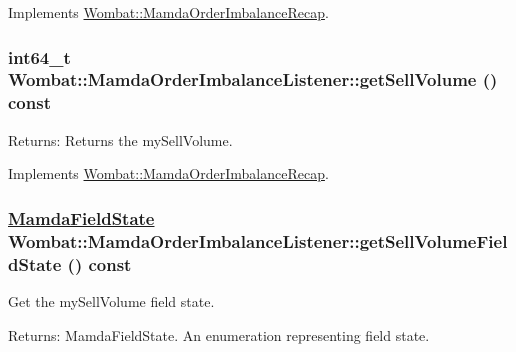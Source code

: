 Implements \hyperlink{classWombat_1_1MamdaOrderImbalanceRecap_869bc84756e63963c4b47e0c63ae92c4}{Wombat::Mamda\-Order\-Imbalance\-Recap}.\hypertarget{classWombat_1_1MamdaOrderImbalanceListener_fce0392a0c33cf57e534908cb29cd10e}{
\subsubsection[getSellVolume]{\setlength{\rightskip}{0pt plus 5cm}int64\_\-t Wombat::Mamda\-Order\-Imbalance\-Listener::get\-Sell\-Volume () const}}
\label{classWombat_1_1MamdaOrderImbalanceListener_fce0392a0c33cf57e534908cb29cd10e}


\begin{Desc}
\item[Returns:]Returns the my\-Sell\-Volume. \end{Desc}


Implements \hyperlink{classWombat_1_1MamdaOrderImbalanceRecap_cb0e8ad41a7b39232e2ccb88a661d566}{Wombat::Mamda\-Order\-Imbalance\-Recap}.\hypertarget{classWombat_1_1MamdaOrderImbalanceListener_83655805e56c6a77ef48d0b6a5129f7b}{
\subsubsection[getSellVolumeFieldState]{\setlength{\rightskip}{0pt plus 5cm}\hyperlink{namespaceWombat_93aac974f2ab713554fd12a1fa3b7d2a}{Mamda\-Field\-State} Wombat::Mamda\-Order\-Imbalance\-Listener::get\-Sell\-Volume\-Field\-State () const}}
\label{classWombat_1_1MamdaOrderImbalanceListener_83655805e56c6a77ef48d0b6a5129f7b}


Get the my\-Sell\-Volume field state. 

\begin{Desc}
\item[Returns:]Mamda\-Field\-State. An enumeration representing field state. \end{Desc}


